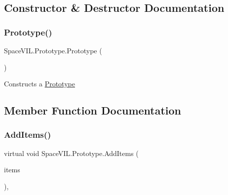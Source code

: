 \subsection{Constructor \& Destructor Documentation}
\mbox{\label{class_space_v_i_l_1_1_prototype_a9205e6953992749881d7de1af9dc492e}} 
\subsubsection{\texorpdfstring{Prototype()}{Prototype()}}
{\footnotesize\ttfamily Space\+V\+I\+L.\+Prototype.\+Prototype (\begin{DoxyParamCaption}{ }\end{DoxyParamCaption})\hspace{0.3cm}{\ttfamily [inline]}}



Constructs a \mbox{\hyperlink{class_space_v_i_l_1_1_prototype}{Prototype}} 



\subsection{Member Function Documentation}
\mbox{\label{class_space_v_i_l_1_1_prototype_a41f1a65df4f13b958dfdab342266a357}} 
\subsubsection{\texorpdfstring{Add\+Items()}{AddItems()}}
{\footnotesize\ttfamily virtual void Space\+V\+I\+L.\+Prototype.\+Add\+Items (\begin{DoxyParamCaption}\item[{params \mbox{\hyperlink{interface_space_v_i_l_1_1_core_1_1_i_base_item}{I\+Base\+Item}} \mbox{[}$\,$\mbox{]}}]{items }\end{DoxyParamCaption})\hspace{0.3cm}{\ttfamily [inline]}, {\ttfamily [virtual]}}



